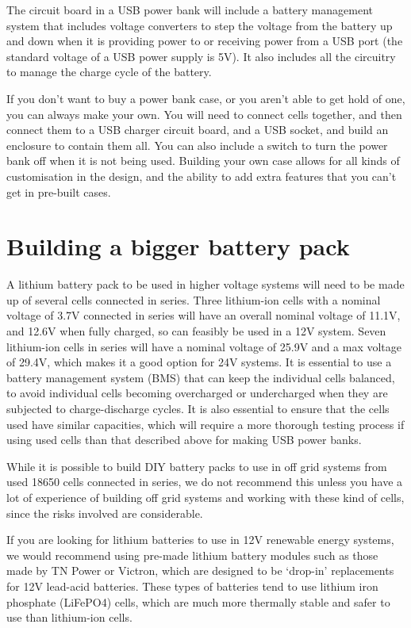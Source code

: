 \documentclass{article}
\theoremstyle{definition}
\theoremstyle{definition}
\theoremstyle{remark}
\begin{document}
  The circuit board in a USB power bank will include a battery management system that includes voltage converters to step the voltage from the battery up and down when it is providing power to or receiving power from a USB port (the standard voltage of a USB power supply is 5V). It also includes all the circuitry to manage the charge cycle of the battery.

  If you don’t want to buy a power bank case, or you aren’t able to get hold of one, you can always make your own. You will need to connect cells together, and then connect them to a USB charger circuit board, and a USB socket, and build an enclosure to contain them all. You can also include a switch to turn the power bank off when it is not being used. Building your own case allows for all kinds of customisation in the design, and the ability to add extra features that you can’t get in pre-built cases.


\section{Building a bigger battery pack} %
\label{sec:building_a_bigger_battery_pack}

  A lithium battery pack to be used in higher voltage systems will need to be made up of several cells connected in series. Three lithium-ion cells with a nominal voltage of 3.7V connected in series will have an overall nominal voltage of 11.1V, and 12.6V when fully charged, so can feasibly be used in a 12V system. Seven lithium-ion cells in series will have a nominal voltage of 25.9V and a max voltage of 29.4V, which makes it a good option for 24V systems. It is essential to use a battery management system (BMS) that can keep the individual cells balanced, to avoid individual cells becoming overcharged or undercharged when they are subjected to charge-discharge cycles. It is also essential to ensure that the cells used have similar capacities, which will require a more thorough testing process if using used cells than that described above for making USB power banks. 

  While it is possible to build DIY battery packs to use in off grid systems from used 18650 cells connected in series, we do not recommend this unless you have a lot of experience of building off grid systems and working with these kind of cells, since the risks involved are considerable.

  If you are looking for lithium batteries to use in 12V renewable energy systems, we would recommend using pre-made lithium battery modules such as those made by TN Power or Victron, which are designed to be ‘drop-in’ replacements for 12V lead-acid batteries. These types of batteries tend to use lithium iron phosphate (LiFePO4) cells, which are much more thermally stable and safer to use than lithium-ion cells.
\end{document}
